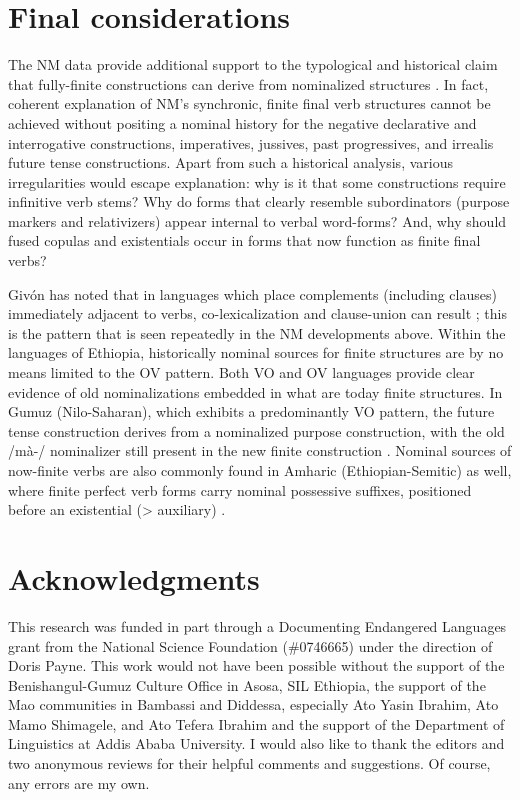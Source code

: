 \documentclass[output=paper]{langsci/langscibook}
\begin{document}
\section{Final considerations}\label{sec:mahland:4}


The NM data provide additional support to the typological and historical claim that fully-finite constructions can derive from nominalized structures \citep{Gildea1993, Heine1993, Anderson2006, Anderson2011, DeLancey2011}. In fact, coherent explanation of NM's synchronic, finite final verb structures cannot be achieved without positing a nominal history for the negative declarative and interrogative constructions, imperatives, jussives, past progressives, and irrealis future tense constructions. Apart from such a historical analysis, various irregularities would escape explanation: why is it that some constructions require infinitive verb stems? Why do forms that clearly resemble subordinators (purpose markers and relativizers) appear internal to verbal word-forms? And, why should fused copulas and existentials occur in forms that now function as finite final verbs? 


Givón has noted that in languages which place complements (including clauses) immediately adjacent to verbs, co-lexicalization and clause-union can result \citep[74]{Givon2009}; this is the pattern that is seen repeatedly in the NM developments above. Within the languages of Ethiopia, historically nominal sources for finite structures are by no means limited to the OV pattern. Both VO and OV languages provide clear evidence of old nominalizations embedded in what are today finite structures. In Gumuz (Nilo-Saharan), which exhibits a predominantly VO pattern, the future tense construction derives from a nominalized purpose construction, with the old /mà-/ nominalizer still present in the new finite construction \citep[444]{CAhland2012}. Nominal sources of now-finite verbs are also commonly found in Amharic (Ethiopian-Semitic) as well, where finite perfect verb forms carry nominal possessive suffixes, positioned before an existential ({>} auxiliary) \citep[387]{Leslau1995}.  

\section*{\textbf{Acknowledgments}}

This research was funded in part through a Documenting Endangered Languages grant from the National Science Foundation (\#0746665) under the direction of Doris Payne. This work would not have been possible without the support of the Benishangul-Gumuz Culture Office in Asosa, SIL Ethiopia, the support of the Mao communities in Bambassi and Diddessa, especially Ato Yasin Ibrahim, Ato Mamo Shimagele, and Ato Tefera Ibrahim and the support of the Department of Linguistics at Addis Ababa University. I would also like to thank the editors and two anonymous reviews for their helpful comments and suggestions. Of course, any errors are my own. 
\end{document}
